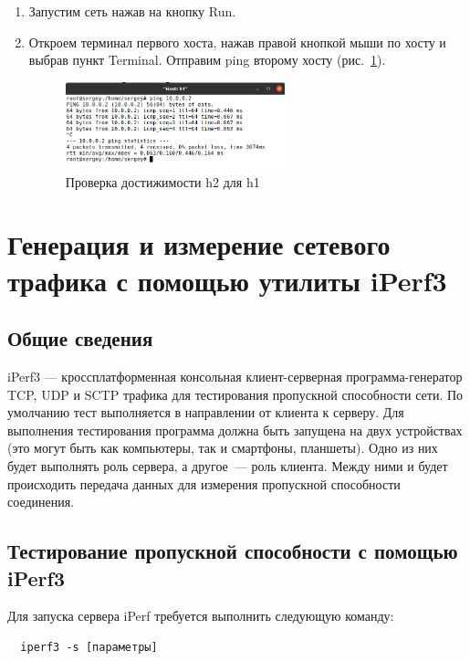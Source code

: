 \begin{enumerate}
\item Запустим сеть нажав на кнопку Run.
\item Откроем терминал первого хоста, нажав правой кнопкой мыши по
  хосту и выбрав пункт Terminal. Отправим ping второму хосту (рис.~\ref{fig:0005}).

\begin{figure}[!h]
\centering
\includegraphics[width=0.6\textwidth]{image/mininet_2.5.png}
\caption{Проверка достижимости h2 для h1}
\label{fig:0005}
\end{figure}

\end{enumerate}

\section{Генерация и измерение сетевого трафика с помощью утилиты
  iPerf3}

\subsection{Общие сведения}

iPerf3 \cite{iperf} --- кроссплатформенная консольная клиент-серверная
программа-генератор TCP, UDP и SCTP трафика для тестирования
пропускной способности сети. По умолчанию тест выполняется в
направлении от клиента к серверу. Для выполнения тестирования
программа должна быть запущена на двух устройствах (это могут быть как
компьютеры, так и смартфоны, планшеты). Одно из них будет выполнять
роль сервера, а другое~--- роль клиента. Между ними и будет
происходить передача данных для измерения пропускной способности
соединения.

\subsection{Тестирование пропускной способности с помощью iPerf3}

Для запуска сервера iPerf требуется выполнить следующую команду:
\begin{verbatim}
  iperf3 -s [параметры]
\end{verbatim}

